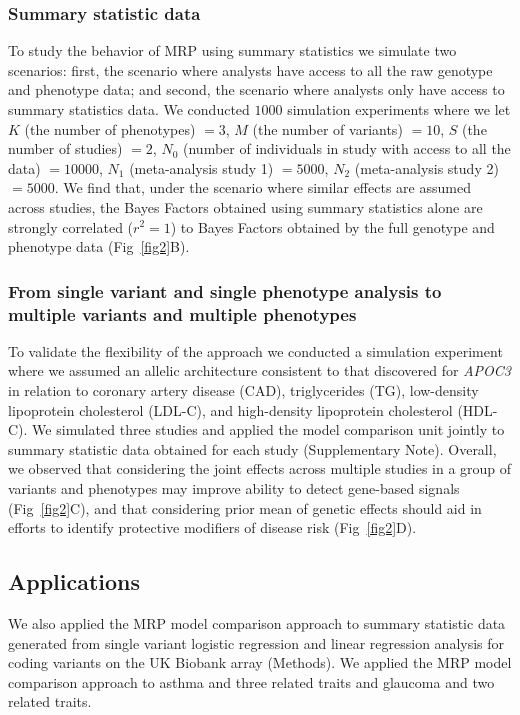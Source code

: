 \subsubsection*{Summary statistic data}
To study the behavior of MRP using summary statistics we simulate two scenarios: first, the scenario where analysts have access to all the raw genotype and phenotype data; and second, the scenario where analysts only have access to summary statistics data\cite{liu2014meta}. We conducted $1000$ simulation experiments where we let $K$ (the number of phenotypes) $=3$, $M$ (the number of variants) $=10$, $S$ (the number of studies) $=2$, $N_0$ (number of individuals in study with access to all the data) $= 10000$, $N_1$ (meta-analysis study 1) $= 5000$, $N_2$ (meta-analysis study 2) $= 5000$. We find that, under the scenario where similar effects are assumed across studies, the Bayes Factors obtained using summary statistics alone are strongly correlated ($r^2 = 1$) to Bayes Factors obtained by the full genotype and phenotype data (Fig~\ref{fig2}B).

\subsubsection*{From single variant and single phenotype analysis to multiple variants and multiple phenotypes}
To validate the flexibility of the approach we conducted a simulation experiment where we assumed an allelic architecture consistent to that discovered for {\it APOC3} in relation to coronary artery disease (CAD), triglycerides (TG), low-density lipoprotein cholesterol (LDL-C), and high-density lipoprotein cholesterol (HDL-C)\cite{apoc3,apoc32,jorgensen2014loss,cohorts2014loss}. We simulated three studies and applied the model comparison unit jointly to summary statistic data obtained for each study (Supplementary Note). Overall, we observed that considering the joint effects across multiple studies in a group of variants and phenotypes may improve ability to detect gene-based signals (Fig~\ref{fig2}C), and that considering prior mean of genetic effects should aid in efforts to identify protective modifiers of disease risk (Fig~\ref{fig2}D).

\subsection*{Applications}
We also applied the MRP model comparison approach to summary statistic data generated from single variant logistic regression and linear regression analysis for coding variants on the UK Biobank array (Methods). We applied the MRP model comparison approach to asthma and three related traits and glaucoma and two related traits.

